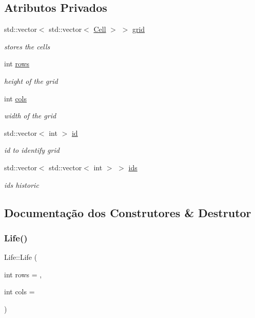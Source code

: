 \subsection*{Atributos Privados}
\begin{DoxyCompactItemize}
\item 
std\+::vector$<$ std\+::vector$<$ \hyperlink{life_8h_a0133c02dfc35ffbaf07ad1a587dac4d1}{Cell} $>$ $>$ \hyperlink{classLife_aa83b518c319016fa8f962d24a6e487a6}{grid}
\begin{DoxyCompactList}\small\item\em stores the cells \end{DoxyCompactList}\item 
int \hyperlink{classLife_ab4d1ea4344ba31a4686f388edb7e2927}{rows}
\begin{DoxyCompactList}\small\item\em height of the grid \end{DoxyCompactList}\item 
int \hyperlink{classLife_a31a428734f7dc76ca386963139699ac6}{cols}
\begin{DoxyCompactList}\small\item\em width of the grid \end{DoxyCompactList}\item 
std\+::vector$<$ int $>$ \hyperlink{classLife_ab33d6ee162673a71742a3df07a0a2e2f}{id}
\begin{DoxyCompactList}\small\item\em id to identify grid \end{DoxyCompactList}\item 
std\+::vector$<$ std\+::vector$<$ int $>$ $>$ \hyperlink{classLife_a9b8514842a22ce3d280e9e576a149dab}{ids}
\begin{DoxyCompactList}\small\item\em ids historic \end{DoxyCompactList}\end{DoxyCompactItemize}


\subsection{Documentação dos Construtores \& Destrutor}
\mbox{\label{classLife_a240039599d8a70206d1047e947eb5a24}} 
\subsubsection{\texorpdfstring{Life()}{Life()}\hspace{0.1cm}{\footnotesize\ttfamily [1/2]}}
{\footnotesize\ttfamily Life\+::\+Life (\begin{DoxyParamCaption}\item[{int}]{rows = {},  }\item[{int}]{cols = {} }\end{DoxyParamCaption})}



